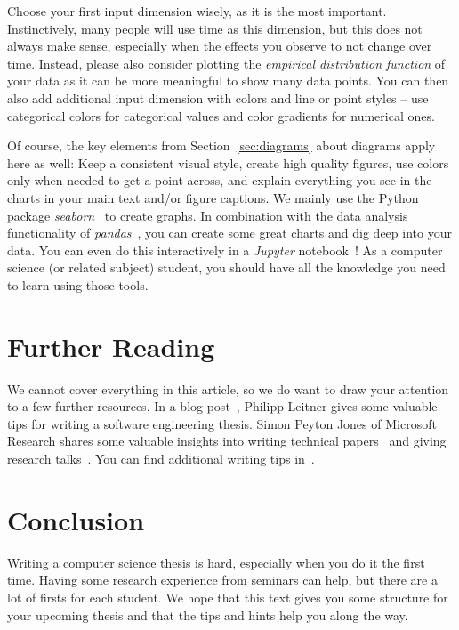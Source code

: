 \documentclass[a4paper]{article}
\begin{document}
Choose your first input dimension wisely, as it is the most important.
Instinctively, many people will use time as this dimension, but this does not always make sense, especially when the effects you observe to not change over time.
Instead, please also consider plotting the \emph{empirical distribution function} of your data as it can be more meaningful to show many data points.
You can then also add additional input dimension with colors and line or point styles -- use categorical colors for categorical values and color gradients for numerical ones.

Of course, the key elements from Section~\ref{sec:diagrams} about diagrams apply here as well:
Keep a consistent visual style, create high quality figures, use colors only when needed to get a point across, and explain everything you see in the charts in your main text and/or figure captions.
We mainly use the Python package \emph{seaborn}~\cite{seaborn} to create graphs.
In combination with the data analysis functionality of \emph{pandas}~\cite{pandas}, you can create some great charts and dig deep into your data.
You can even do this interactively in a \emph{Jupyter} notebook~\cite{jupyter}!
As a computer science (or related subject) student, you should have all the knowledge you need to learn using those tools.

\section{Further Reading}
\label{sec:resources}

We cannot cover everything in this article, so we do want to draw your attention to a few further resources.
In a blog post~\cite{leitner}, Philipp Leitner gives some valuable tips for writing a software engineering thesis.
Simon Peyton Jones of Microsoft Research shares some valuable insights into writing technical papers~\cite{jones-paper} and giving research talks~\cite{jones-talk}.
You can find additional writing tips in~\cite{patterson-writing,ernst-writing,schulzrinne-writing}.

\section{Conclusion}
\label{sec:conclusion}

Writing a computer science thesis is hard, especially when you do it the first time.
Having some research experience from seminars can help, but there are a lot of firsts for each student.
We hope that this text gives you some structure for your upcoming thesis and that the tips and hints help you along the way.

\printbibliography
\end{document}
